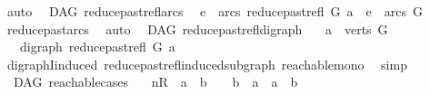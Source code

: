 \begin{isabellebody}
\ auto%
\endisatagproof
{\isafoldproof}%
%
\isadelimproof
\isanewline
%
\endisadelimproof
\isanewline
{}\isamarkupfalse%
\ {\isacharparenleft}{\kern0pt}\ DAG{\isacharparenright}{\kern0pt}\ reduce{\isacharunderscore}{\kern0pt}past{\isacharunderscore}{\kern0pt}refl{\isacharunderscore}{\kern0pt}arcs{}{\isacharcolon}{\kern0pt}\isanewline
\ \ {\isachardoublequoteopen}e\ {\isasymin}\ arcs\ {\isacharparenleft}{\kern0pt}reduce{\isacharunderscore}{\kern0pt}past{\isacharunderscore}{\kern0pt}refl\ G\ a{\isacharparenright}{\kern0pt}\ {\isasymLongrightarrow}\ e\ {\isasymin}\ arcs\ G{\isachardoublequoteclose}\isanewline
%
\isadelimproof
\ \ %
\endisadelimproof
%
\isatagproof
{}\isamarkupfalse%
\ reduce{\isacharunderscore}{\kern0pt}past{\isacharunderscore}{\kern0pt}arcs\ \isamarkupfalse%
\ auto%
\endisatagproof
{\isafoldproof}%
%
\isadelimproof
\isanewline
%
\endisadelimproof
\isanewline
{}\isamarkupfalse%
\ {\isacharparenleft}{\kern0pt}\ DAG{\isacharparenright}{\kern0pt}\ reduce{\isacharunderscore}{\kern0pt}past{\isacharunderscore}{\kern0pt}refl{\isacharunderscore}{\kern0pt}digraph{\isacharcolon}{\kern0pt}\isanewline
\ \ \ {\isachardoublequoteopen}a\ {\isasymin}\ verts\ G{\isachardoublequoteclose}\isanewline
\ \ \ {\isachardoublequoteopen}digraph\ {\isacharparenleft}{\kern0pt}reduce{\isacharunderscore}{\kern0pt}past{\isacharunderscore}{\kern0pt}refl\ G\ a{\isacharparenright}{\kern0pt}{\isachardoublequoteclose}\isanewline
%
\isadelimproof
\ \ %
\endisadelimproof
%
\isatagproof
{}\isamarkupfalse%
\ digraphI{\isacharunderscore}{\kern0pt}induced\ reduce{\isacharunderscore}{\kern0pt}past{\isacharunderscore}{\kern0pt}refl{\isacharunderscore}{\kern0pt}induced{\isacharunderscore}{\kern0pt}subgraph\ reachable{\isacharunderscore}{\kern0pt}mono\ \isamarkupfalse%
\ simp%
\endisatagproof
{\isafoldproof}%
%
\isadelimproof
%
\endisadelimproof
%
\isadelimdocument
%
\endisadelimdocument
%
\isatagdocument
%
\isamarkuptrue%
%
\endisatagdocument
{\isafolddocument}%
%
\isadelimdocument
%
\endisadelimdocument
{}\isamarkupfalse%
\ {\isacharparenleft}{\kern0pt}\ DAG{\isacharparenright}{\kern0pt}\ reachable{}{\isacharunderscore}{\kern0pt}cases{\isacharcolon}{\kern0pt}\isanewline
\ \ \ {\isacharparenleft}{\kern0pt}nR{\isacharparenright}{\kern0pt}\ {\isachardoublequoteopen}{\isasymnot}\ a\ {\isasymrightarrow}\isactrlsup {\isacharplus}{\kern0pt}\ b\ {\isasymand}\ {\isasymnot}\ \ b\ {\isasymrightarrow}\isactrlsup {\isacharplus}{\kern0pt}\ a\ {\isasymand}\ a\ {\isasymnoteq}\ b{\isachardoublequoteclose}\isanewline

\end{isabellebody}
